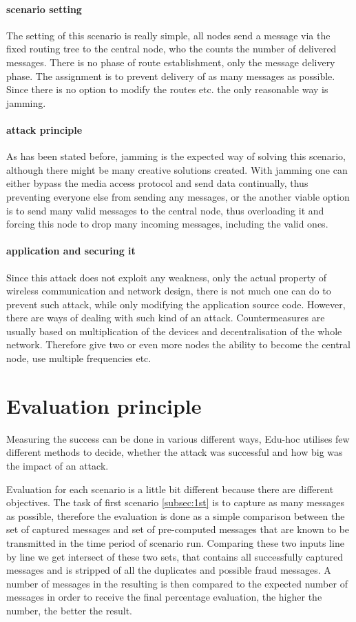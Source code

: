 \documentclass[
  print, %
  table,   %
  nolof,     %
  nolot,     %
           oneside
]{fithesis3}
\begin{document}
    \paragraph{scenario setting}
    The setting of this scenario is really simple, all nodes send a message via the fixed routing tree to the central node, who the counts the number of delivered messages. There is no phase of route establishment, only the message delivery phase. The assignment is to prevent delivery of as many messages as possible. Since there is no option to modify the routes etc. the only reasonable way is jamming.

    \paragraph{attack principle}
    As has been stated before, jamming is the expected way of solving this scenario, although there might be many creative solutions created. With jamming one can either bypass the media access protocol and send data continually, thus preventing everyone else from sending any messages, or the another viable option is to send many valid messages to the central node, thus overloading it and forcing this node to drop many incoming messages, including the valid ones.

    \paragraph{application and securing it}
    Since this attack does not exploit any weakness, only the actual property of wireless communication and network design, there is not much one can do to prevent such attack, while only modifying the application source code. However, there are ways of dealing with such kind of an attack. Countermeasures are usually based on multiplication of the devices and decentralisation of the whole network. Therefore give two or even more nodes the ability to become the central node, use multiple frequencies etc. %

  \section{Evaluation principle}\label{sec:eval}
  Measuring the success can be done in various different ways, Edu-hoc utilises few different methods to decide, whether the attack was successful and how big was the impact of an attack.

  Evaluation for each scenario is a little bit different because there are different objectives. The task of first scenario \ref{subsec:1st} is to capture as many messages as possible, therefore the evaluation is done as a simple comparison between the set of captured messages and set of pre-computed messages that are known to be transmitted in the time period of scenario run. Comparing these two inputs line by line we get intersect of these two sets, that contains all successfully captured messages and is stripped of all the duplicates and possible fraud messages. A number of messages in the resulting is then compared to the expected number of messages in order to receive the final percentage evaluation, the higher the number, the better the result.
\end{document}
